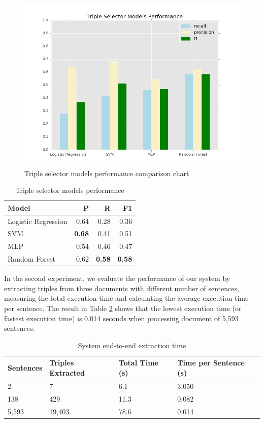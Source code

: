 \documentclass[conference,compsoc,12pt]{IEEEtran}
\begin{document}
\begin{figure}
\includegraphics[scale=0.4]{../images/models_performance.png}
\caption{Triple selector models performance comparison chart}
\label{fig_models_performance}
\end{figure}

\begin{table}[!t]
\renewcommand{\arraystretch}{1.5}
\caption{Triple selector models performance}
\label{table_models_performance}
\centering
\begin{tabular}{l r r r}
\hline
\textbf{Model} & \textbf{P} & \textbf{R} & \textbf{F1} \\
\hline
Logistic Regression & 0.64 & 0.28 & 0.36 \\
SVM & \textbf{0.68} & 0.41 & 0.51 \\
MLP & 0.54 & 0.46 & 0.47 \\
Random Forest & 0.62 & \textbf{0.58} & \textbf{0.58} \\
\hline
\end{tabular}
\end{table}

In the second experiment, we evaluate the performance of our system by extracting triples from three documents with different number of sentences, measuring the total execution time and calculating the average execution time per sentence. The result in Table \ref{table_system_extraction_time} shows that the lowest execution time (or fastest execution time) is 0.014 seconds when processing document of 5,593 sentences.

\begin{table}[!t]
	\renewcommand{\arraystretch}{1.5}
	\caption{System end-to-end extraction time}
	\label{table_system_extraction_time}
	\centering
	\begin{tabular}{l p{1.2cm} p{1.2cm} p{1.2cm}}
		\hline
		\textbf{Sentences} & \textbf{Triples Extracted} & \textbf{Total Time (s)} & \textbf{Time per Sentence (s)} \\
		\hline
		2 & 7 & 6.1 & 3.050 \\
		138 & 429 & 11.3 & 0.082 \\
		5,593 & 19,403 & 78.6 & 0.014 \\
		\hline
	\end{tabular}
\end{table}
\end{document}
